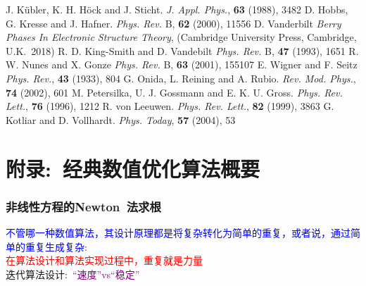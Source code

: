 {{\begin{thebibliography}{99}
{\textrm{J. K\"ubler, K. H. H\"ock and J. Sticht. \textit{J. Appl. Phys.}, \textbf{63} (1988), 3482}
\textrm{D. Hobbs, G. Kresse and J. Hafner. \textit{Phys. Rev.} B, \textbf{62} (2000), 11556}
	\textrm{D. Vanderbilt \textit{Berry Phases In Electronic Structure Theory}, (Cambridge University Press, Cambridge, U.K.~2018)}
	\textrm{R. D. King-Smith and D. Vandebilt \textit{Phys. Rev.} B, \textbf{47} (1993), 1651}
	\textrm{R. W. Nunes and X. Gonze \textit{Phys. Rev.} B, \textbf{63} (2001), 155107}
	\textrm{E. Wigner and F. Seitz \textit{Phys. Rev.}, \textbf{43} (1933), 804}
\textrm{G. Onida, L. Reining and A. Rubio. \textit{Rev. Mod. Phys.}, \textbf{74} (2002), 601}
\textrm{M. Petersilka, U. J. Gossmann and E. K. U. Gross. \textit{Phys. Rev. Lett.}, \textbf{76} (1996), 1212}
\textrm{R. von Leeuwen. \textit{Phys. Rev. Lett.}, \textbf{82} (1999), 3863}
\textrm{G. Kotliar and D. Vollhardt. \textit{Phys. Today}, \textbf{57} (2004), 53}
}
\end{thebibliography}
}

\appendix
\section{附录:~经典数值优化算法概要}
\frame
{
	\frametitle{非线性方程的\textrm{Newton~}法求根}
	\textcolor{blue}{不管哪一种数值算法，其设计原理都是将复杂转化为简单的重复，或者说，通过简单的重复生成复杂}:\\
	\textcolor{red}{在算法设计和算法实现过程中，重复就是力量}\\
迭代算法设计:~\textcolor{purple}{“速度”\textrm{vs}“稳定”}
\begin{figure}[h!]
\centering
{}
\label{Equation_Newon}
\end{figure}
}

}
